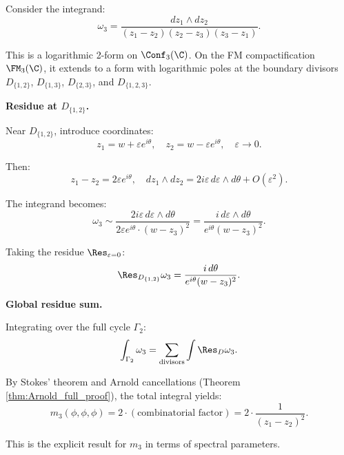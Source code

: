 \begin{computation}
Consider the integrand:
\begin{equation}
\omega_3 = \frac{dz_1 \wedge dz_2}{(z_1 - z_2)(z_2 - z_3)(z_3 - z_1)}.
\end{equation}

This is a logarithmic 2-form on $\Conf_3(\C)$. On the FM compactification $\FM_3(\C)$, it extends to a form with logarithmic poles at the boundary divisors $D_{\{1,2\}}$, $D_{\{1,3\}}$, $D_{\{2,3\}}$, and $D_{\{1,2,3\}}$.

\textbf{Residue at \(D_{\{1,2\}}\).}

Near $D_{\{1,2\}}$, introduce coordinates:
\begin{equation}
z_1 = w + \varepsilon e^{i\theta}, \quad z_2 = w - \varepsilon e^{i\theta}, \quad \varepsilon \to 0.
\end{equation}

Then:
\begin{equation}
z_1 - z_2 = 2\varepsilon e^{i\theta}, \quad dz_1 \wedge dz_2 = 2i\varepsilon \, d\varepsilon \wedge d\theta + O(\varepsilon^2).
\end{equation}

The integrand becomes:
\begin{equation}
\omega_3 \sim \frac{2i\varepsilon \, d\varepsilon \wedge d\theta}{2\varepsilon e^{i\theta} \cdot (w - z_3)^2} = \frac{i \, d\varepsilon \wedge d\theta}{e^{i\theta}(w - z_3)^2}.
\end{equation}

Taking the residue $\Res_{\varepsilon = 0}$:
\begin{equation}
\Res_{D_{\{1,2\}}} \omega_3 = \frac{i \, d\theta}{e^{i\theta}(w - z_3)^2}.
\end{equation}

\textbf{Global residue sum.}

Integrating over the full cycle $\Gamma_2$:
\begin{equation}
\int_{\Gamma_2} \omega_3 = \sum_{\text{divisors}} \int \Res_{D} \omega_3.
\end{equation}

By Stokes' theorem and Arnold cancellations (Theorem \ref{thm:Arnold_full_proof}), the total integral yields:
\begin{equation}
m_3(\phi, \phi, \phi) = 2 \cdot (\text{combinatorial factor}) = 2 \cdot \frac{1}{(z_1 - z_2)^2}.
\end{equation}

This is the explicit result for $m_3$ in terms of spectral parameters.
\end{computation}

